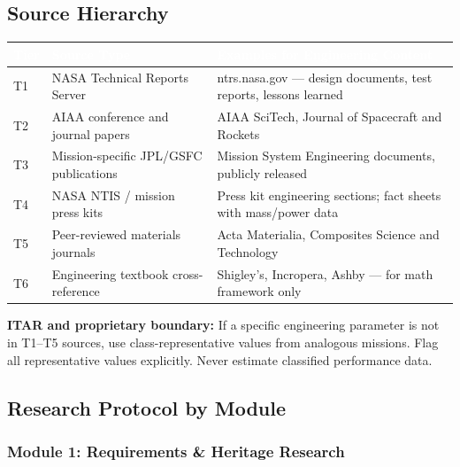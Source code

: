 \documentclass[11pt,letterpaper]{article}
\newcommand{\tableheader}[1]{\textbf{\sffamily\textcolor{white}{#1}}}
\begin{document}
\subsection{Source Hierarchy}

\begin{center}
\begin{tabularx}{\textwidth}{C{1.2cm}L{4cm}X}
\toprule
{}
\tableheader{Tier} & \tableheader{Source Type} & \tableheader{Examples for Engineering Content} \\
\midrule
T1 & NASA Technical Reports Server & ntrs.nasa.gov --- design documents, test reports, lessons learned \\
T2 & AIAA conference and journal papers & AIAA SciTech, Journal of Spacecraft and Rockets \\
T3 & Mission-specific JPL/GSFC publications & Mission System Engineering documents, publicly released \\
T4 & NASA NTIS / mission press kits & Press kit engineering sections; fact sheets with mass/power data \\
T5 & Peer-reviewed materials journals & Acta Materialia, Composites Science and Technology \\
T6 & Engineering textbook cross-reference & Shigley's, Incropera, Ashby --- for math framework only \\
\bottomrule
\end{tabularx}
\end{center}

\textbf{ITAR and proprietary boundary:} If a specific engineering parameter is not in T1--T5 sources, use class-representative values from analogous missions. Flag all representative values explicitly. Never estimate classified performance data.

\subsection{Research Protocol by Module}

\subsubsection{Module 1: Requirements \& Heritage Research}
\end{document}
